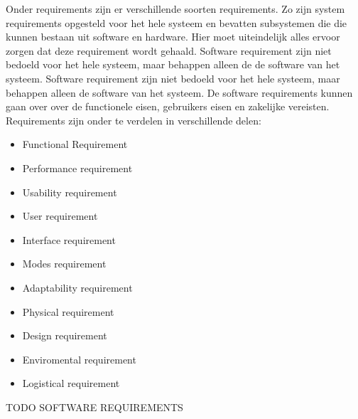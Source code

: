 \documentclass{article}%
\begin{document}
Onder requirements zijn er verschillende soorten requirements. Zo zijn system requirements opgesteld voor het hele systeem en bevatten subsystemen die die kunnen bestaan uit software en hardware. Hier moet uiteindelijk alles ervoor zorgen dat deze requirement wordt gehaald. Software requirement zijn niet bedoeld voor het hele systeem, maar behappen alleen de de software van het systeem. Software requirement zijn niet bedoeld voor het hele systeem, maar behappen alleen de software van het systeem. De software requirements kunnen gaan over over de functionele eisen, gebruikers eisen en zakelijke vereisten.
Requirements zijn onder te verdelen in verschillende delen: 
\begin{multicols}{2}
\begin{itemize}
\item Functional Requirement
\item Performance requirement
\item Usability requirement
\item User requirement
\item Interface requirement
\item Modes requirement
\item Adaptability requirement
\item Physical requirement
\item Design requirement
\item Enviromental requirement
\item Logistical requirement
\end{itemize}
\end{multicols}
TODO SOFTWARE REQUIREMENTS\\

\end{document}
